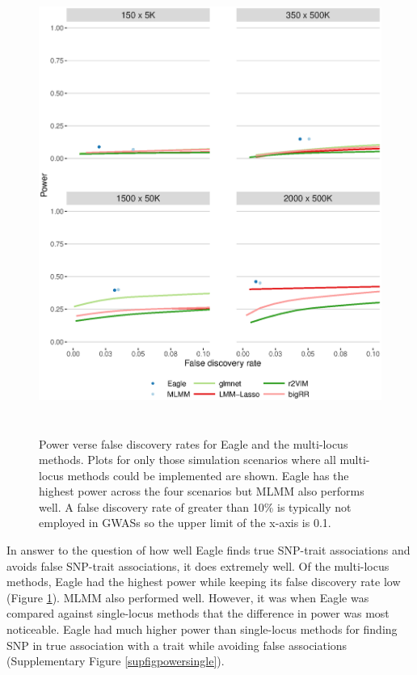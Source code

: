 \documentclass{nature}
\begin{document}
\begin{figure}
\caption{Power verse false discovery rates for Eagle and the multi-locus methods. Plots for only those simulation 
scenarios where all multi-locus methods could be implemented are shown.  Eagle has the highest power across the four 
scenarios but MLMM also performs well. A false discovery rate of greater than 10\% is typically not employed in GWASs so the 
upper limit of the x-axis is 0.1.}
\label{figpowermultiple}
\begin{center}
\includegraphics[width=15cm, height=15cm]{power1main.eps}
\end{center}

\end{figure}







In answer to the question of how well Eagle finds true SNP-trait associations and avoids false SNP-trait associations, it does extremely 
well.  Of the multi-locus methods, Eagle had the highest power
while keeping its false discovery rate low (Figure \ref{figpowermultiple}). MLMM also performed well. However, it was when Eagle was compared against single-locus methods 
that the difference in power was most noticeable.  Eagle had much higher power than single-locus methods for finding SNP in true 
association with a trait while avoiding false associations (Supplementary Figure \ref{supfigpowersingle}). 
\end{document}
